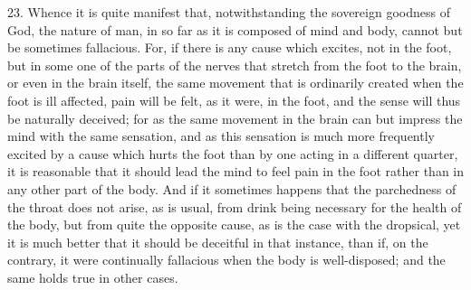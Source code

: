 23. Whence it is quite manifest that, notwithstanding the sovereign goodness of God, the nature of man, in so far as it is composed of mind and body, cannot but be sometimes fallacious. For, if there is any cause which excites, not in the foot, but in some one of the parts of the nerves that stretch from the foot to the brain, or even in the brain itself, the same movement that is ordinarily created when the foot is ill affected, pain will be felt, as it were, in the foot, and the sense will thus be naturally deceived; for as the same movement in the brain can but impress the mind with the same sensation, and as this sensation is much more frequently excited by a cause which hurts the foot than by one acting in a different quarter, it is reasonable that it should lead the mind to feel pain in the foot rather than in any other part of the body. And if it sometimes happens that the parchedness of the throat does not arise, as is usual, from drink being necessary for the health of the body, but from quite the opposite cause, as is the case with the dropsical, yet it is much better that it should be deceitful in that instance, than if, on the contrary, it were continually fallacious when the body is well-disposed; and the same holds true in other cases.

